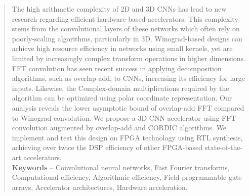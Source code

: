 \documentclass[normalnum]{politex}
\begin{document}
\begin{abstract}
  The high arithmetic complexity of 2D and 3D CNNs has lead to new research regarding efficient hardware-based accelerators. This complexity stems from the convolutional layers of these networks which often rely on poorly-scaling algorithms, particularly in 3D. Winograd-based designs can achieve high resource efficiency in networks using small kernels, yet are limited by increasingly complex transform operations in higher dimensions. FFT convolution has seen recent success in applying decomposition algorithms, such as overlap-add, to CNNs, increasing its efficiency for large inputs. Likewise, the Complex-domain multiplications required by the algorithm can be optimized using polar coordinate representation. Our analysis reveals the lower asymptotic bound of overlap-add FFT compared to Winograd convolution. We propose a 3D CNN accelerator using FFT convolution augmented by overlap-add and CORDIC algorithms. We implement and test this design on FPGA technology using RTL synthesis, achieving over twice the DSP efficiency of other FPGA-based state-of-the-art accelerators.
  \\[3\baselineskip]
  \textbf{Keywords} -- Convolutional neural networks, Fast Fourier transforms, Computational efficiency, Algorithmic efficiency, Field programmable gate arrays, Accelerator architectures, Hardware acceleration.
\end{abstract}

\listadefiguras
\listadetabelas
\listadeequacoes
\end{document}
